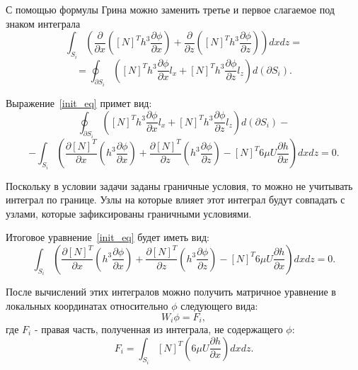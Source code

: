 \documentclass[a4paper,14pt]{extarticle}
\begin{document}
С помощью формулы Грина можно заменить третье и первое слагаемое под знаком интеграла
\begin{equation*}
	\int_{S_i} {\left(\frac{\partial}{\partial x} \left( [N]^T h^3 \frac{\partial \phi}{\partial x} \right) + \frac{\partial}{\partial z} \left( [N]^T h^3 \frac{\partial \phi}{\partial z} \right)  \right)   dxdz} =
\end{equation*}
\begin{equation*}
	= \oint_{\partial S_i} { \left( [N]^T h^3 \frac{\partial \phi}{\partial x} l_x +   [N]^T h^3 \frac{\partial \phi}{\partial z} l_z \right)  d \left( \partial S_i \right)}.
\end{equation*}

Выражение~\eqref{init_eq} примет вид:
\begin{equation*}
	\oint_{\partial S_i} { \left( [N]^T h^3 \frac{\partial \phi}{\partial x} l_x +   [N]^T h^3 \frac{\partial \phi}{\partial z} l_z \right)  d \left( \partial S_i \right)} -
\end{equation*}
\begin{equation*}
	- \int_{S_i} {\left( \frac{\partial[N]^T}{\partial x} \left(h^3 \frac{\partial \phi}{\partial x} \right) +  \frac{\partial[N]^T}{\partial z} \left(h^3 \frac{\partial \phi}{\partial z} \right) - [N]^T 6 \mu U \frac{\partial h}{\partial x}\right) dxdz} = 0.
\end{equation*}

Поскольку в условии задачи заданы граничные условия, то можно не учитывать интеграл по границе. Узлы на которые влияет этот интеграл будут совпадать с узлами, которые зафиксированы граничными условиями.

Итоговое уравнение~\eqref{init_eq} будет иметь вид:
\begin{equation*}
	\int_{S_i} {\left( \frac{\partial[N]^T}{\partial x} \left(h^3 \frac{\partial \phi}{\partial x} \right) +  \frac{\partial[N]^T}{\partial z} \left(h^3 \frac{\partial \phi}{\partial z} \right) - [N]^T 6 \mu U \frac{\partial h}{\partial x}\right) dxdz} = 0.
\end{equation*}

После вычислений этих интегралов можно получить матричное уравнение в локальных координатах относительно $\phi$ следующего вида:
\begin{equation}
W_i \phi = F_i,
\label{ref_local}
\end{equation}
где $F_i$ - правая часть, полученная из интеграла, не содержащего $\phi$:
\begin{equation*}
	F_i = \int_{S_i} [N]^T\left(6 \mu U \frac{\partial h}{\partial x}\right) dx dz.
\end{equation*}
\end{document}

